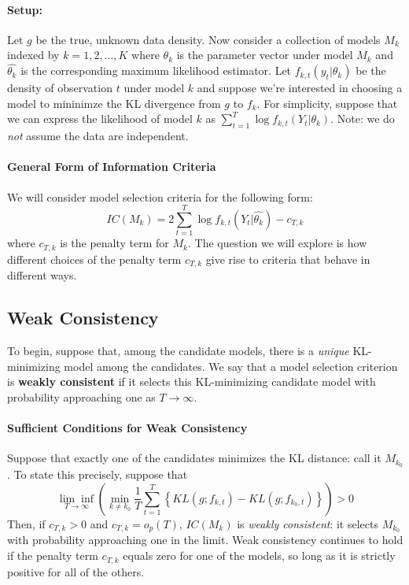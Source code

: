 \paragraph{Setup:}
Let $g$ be the true, unknown data density. 
Now consider a collection of models $M_k$ indexed by $k = 1, 2, \hdots, K$ where $\theta_k$ is the parameter vector under model $M_k$ and $\widehat{\theta_k}$ is the corresponding maximum likelihood estimator.
Let $f_{k,t}(y_t|\theta_k)$ be the density of observation $t$ under model $k$ and suppose we're interested in choosing a model to mininimze the KL divergence from $g$ to $f_k$.
For simplicity, suppose that we can express the likelihood of model $k$ as $\sum_{t=1}^T \log f_{k,t}(Y_t| \theta_k)$. 
Note: we do \emph{not} assume the data are independent. 


\paragraph{General Form of Information Criteria}
We will consider model selection criteria for the following form:
	$$IC(M_k) = 2 \sum_{t=1}^T \log f_{k,t}(Y_t| \widehat{\theta_k}) - c_{T,k}$$
where $c_{T,k}$ is the penalty term for $M_k$. 
The question we will explore is how different choices of the penalty term $c_{T,k}$ give rise to criteria that behave in different ways. 



\subsection{Weak Consistency}
To begin, suppose that, among the candidate models, there is a \emph{unique} KL-minimizing model among the candidates.
We say that a model selection criterion is \textbf{weakly consistent} if it selects this KL-minimizing candidate model with probability approaching one as $T\rightarrow \infty$.

\paragraph{Sufficient Conditions for Weak Consistency}
Suppose that exactly one of the candidates minimizes the KL distance: call it $M_{k_0}$. 
To state this precisely, suppose that
	$$\underset{T\rightarrow \infty}{\lim\inf}\left(\underset{k \neq k_0}{\min} \frac{1}{T}\sum_{t = 1}^T \left\{ KL(g; f_{k,t}) - KL(g;f_{k_0,t}) \right\} \right) > 0$$
Then, if $c_{T,k}> 0$ and $c_{T,k} = o_p(T)$, $IC(M_k)$ is \emph{weakly consistent}: it selects $M_{k_0}$ with probability approaching one in the limit.
Weak consistency continues to hold if the penalty term $c_{T,k}$ equals zero for one of the models, so long as it is strictly positive for all of the others.

